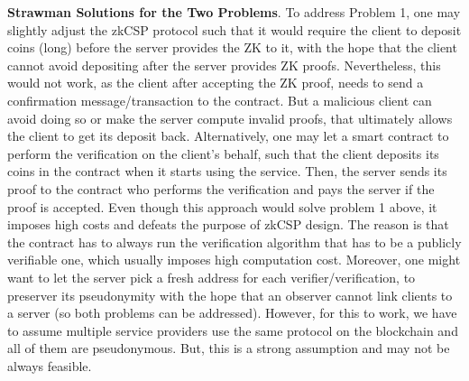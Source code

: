 \noindent\textbf{{Strawman Solutions for the Two Problems}}. To address  Problem 1, one may slightly adjust the zkCSP protocol such that it would require  the client to deposit coins (long) before the server provides the ZK to it, with the hope that the client cannot avoid depositing after the server  provides ZK proofs. Nevertheless, this would not work, as the client after accepting the ZK proof, needs to send a confirmation message/transaction to the contract. But a malicious client can avoid doing so or  make the server compute invalid proofs, that ultimately allows the client to get its deposit back.  Alternatively, one may let a smart contract to perform the verification on the client's behalf, such that the client deposits its coins in the contract when it starts using the service. Then, the server sends its proof to the contract who performs the verification and pays the server if the proof is accepted. Even though this approach would solve problem 1 above, it imposes  high costs and defeats the purpose of zkCSP design. The reason is that the contract has to always run the verification algorithm that  has to be a publicly verifiable one, which  usually imposes high computation cost. Moreover, one might want to let the server pick a fresh address for each verifier/verification, to  preserver its pseudonymity with the hope that an observer cannot link clients to a server (so both problems can be addressed). However, for this to work, we have to assume multiple service providers  use the same protocol on the blockchain and all of them are pseudonymous. But, this is a strong assumption and may  not be always feasible. 

















